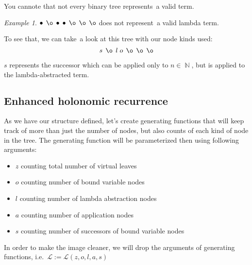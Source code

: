 \documentclass[final]{article}
\theoremstyle{definition}
\theoremstyle{definition}
\theoremstyle{remark}
\newtheorem{example}{Example}[subsection]
\newcommand{\gf}[1]{\ensuremath{\mathcal{#1}}}
\DeclareMathOperator{\N}{\mathbb{N}}
\DeclareMathOperator{\n}{\bullet}
\DeclareMathOperator{\no}{\o}
\begin{document}
You cannote that not every binary tree represents~a valid term.

\begin{example}
    \(\n\; \no\; \n\; \n\; \no\; \no\; \no\) does not represent~a valid lambda term.
\end{example}

To see that, we can take~a look at this tree with our node kinds used:
    \[s\; \no\; l\; o\; \no\; \no\; \no\]

\(s\) represents the successor which can be applied only to \(n \in \N\), but is applied to the lambda-abstracted term.

\subsection{Enhanced holonomic recurrence}%
\label{sub:enhanced_holonomic_reccurence}

As we have our structure defined, let's create generating functions that will keep track of more than just the number of nodes, but also counts of each kind of node in the tree. The generating function will be parameterized then using following arguments:
\begin{itemize}
    \item \(z\) counting total number of virtual leaves
    \item \(o\) counting number of bound variable nodes
    \item \(l\) counting number of lambda abstraction nodes
    \item \(a\) counting number of application nodes
    \item \(s\) counting number of successors of bound variable nodes
\end{itemize}

In order to make the image cleaner, we will drop the arguments of generating functions, i.e.~\(\gf{L} := \gf{L}(z, o, l, a, s)\)
\end{document}
